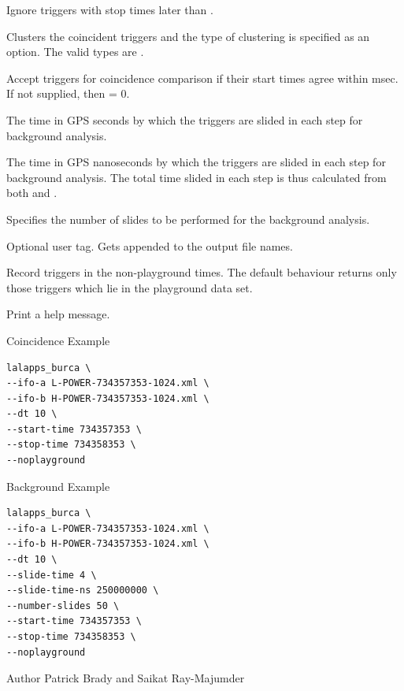 \begin{entry}
\begin{entry}
\item[\option{--stop-time} \parm{GPS seconds}]  Ignore triggers with stop
times later than .

\item[\option{--clustertype} \parm{cluster type}] Clusters the coincident 
triggers and the type of clustering is specified as an option.  The valid
types are .  

\item[\option{--dt} \parm{deltat}]  Accept triggers for coincidence comparison 
if their start times agree within  msec.  If not supplied,  then
 = 0.

\item[\option{--slide-time} \parm{GPS seconds}] The time in GPS seconds by which 
the triggers are slided in each step for background analysis.

\item[\option{--slide-time-ns} \parm{GPS nanoseconds}] The time in GPS 
nanoseconds by which the triggers are slided in each step for background 
analysis.  The total time slided in each step is thus calculated from
both  and .

\item[\option{--number-slides} \parm{number}] Specifies the number of slides
to be performed for the background analysis.  

\item[\option{--user-tag} \parm{tag}] Optional user tag.  Gets appended to the 
output file names.

\item[\option{--noplayground}]  Record triggers in the non-playground times.  
The default behaviour returns only those triggers which lie in the playground 
data set.  

\item[\option{--help}]  Print a help message.
\end{entry}

\item[Coincidence Example]
\begin{verbatim}
lalapps_burca \
--ifo-a L-POWER-734357353-1024.xml \
--ifo-b H-POWER-734357353-1024.xml \
--dt 10 \
--start-time 734357353 \
--stop-time 734358353 \
--noplayground
\end{verbatim}

\item[Background Example]
\begin{verbatim}
lalapps_burca \
--ifo-a L-POWER-734357353-1024.xml \
--ifo-b H-POWER-734357353-1024.xml \
--dt 10 \
--slide-time 4 \
--slide-time-ns 250000000 \
--number-slides 50 \
--start-time 734357353 \
--stop-time 734358353 \
--noplayground
\end{verbatim}

\item[Author] 
Patrick Brady and Saikat Ray-Majumder
\end{entry}
\clearpage


